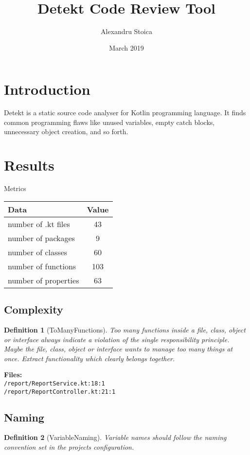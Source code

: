\documentclass[11pt,twocolumn]{article}
\title{Detekt Code Review Tool}
\author{Alexandru Stoica}
\date{March 2019}
\newtheorem{definition}{Definition}
\begin{document}
\maketitle

\section{Introduction}
Detekt is a static source code analyser for Kotlin programming language. It finds common programming flaws like unused variables, empty catch blocks, unnecessary object creation, and so forth. 

\section{Results}

Metrics
\begin{table}[h!]
\begin{tabular}{|l|c|}
\hline
Data                 & Value \\ \hline
number of .kt files  & 43    \\ \hline
number of packages   & 9     \\ \hline
number of classes    & 60    \\ \hline
number of functions  & 103   \\ \hline
number of properties & 63    \\ \hline
\end{tabular}
\end{table}

\subsection{Complexity}
\begin{definition}[ToManyFunctions]
Too many functions inside a file, class, object or interface always indicate a violation of the single responsibility principle. Maybe the file, class, object  or interface wants to manage too many things at once. Extract functionality which clearly belongs together.
\end{definition}

\textbf{Files:} \\
\texttt{/report/ReportService.kt:18:1} \\
\texttt{/report/ReportController.kt:21:1}


\subsection{Naming}
\begin{definition}[VariableNaming]
Variable names should follow the naming convention set in the projects configuration.
\end{definition}
\end{document}

